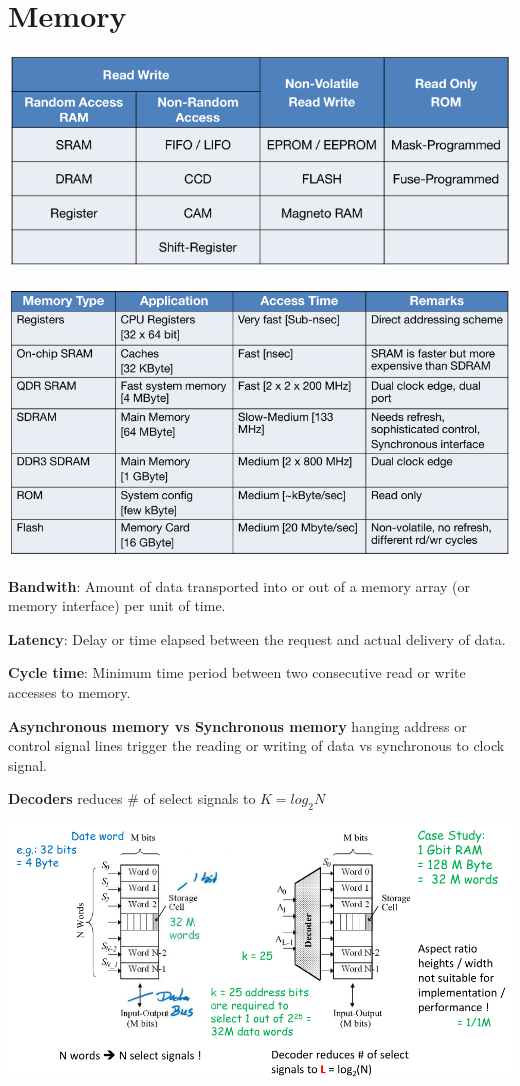 \documentclass[english]{latex4ei/latex4ei_sheet}
\begin{document}
\section{Memory}
\begin{center}
	\includegraphics[width=\linewidth]{images/5.Memory/MemoryClassificatoin.png}
\end{center}
\begin{center}
	\includegraphics[width=\linewidth]{images/5.Memory/MemoryCharacteristics.png}
\end{center}

\textbf{Bandwith}: Amount of data transported into or out of a memory array (or
memory interface) per unit of time.

\textbf{Latency}: Delay or time elapsed between the request and actual delivery of data.

\textbf{Cycle time}: Minimum time period between two consecutive read or write accesses
to memory.

\textbf{Asynchronous memory vs Synchronous memory} hanging address or
control signal lines trigger the reading or writing of data vs synchronous to clock signal.

\textbf{Decoders} reduces \# of select signals to $K = log_2 N$

\begin{center}
  \centering
  \includegraphics[width=0.8\linewidth]{assets/Decoders.png}
  \label{fig:decoders}
\end{center}
\end{document}
